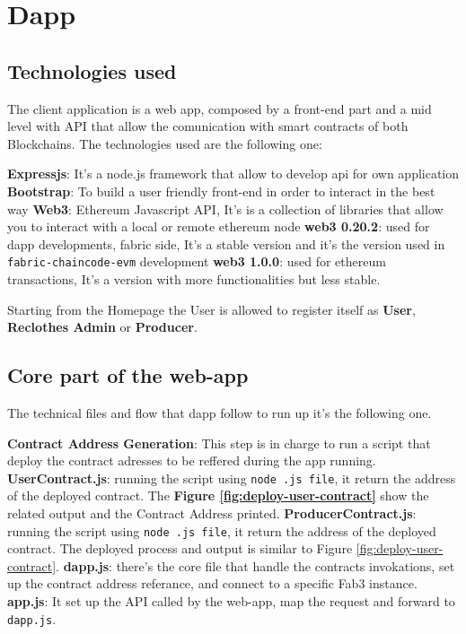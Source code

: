 \section{Dapp}

\subsection{Technologies used}

The client application is a web app, composed by a front-end part and a mid level with API that allow
the comunication with smart contracts of both Blockchains. The technologies used are the following one:

\begin{outline}
    \1 \textbf{Expressjs}: It's a node.js framework that allow to develop api for own application
    \1 \textbf{Bootstrap}: To build a user friendly front-end in order to interact in the best way
    \1 \textbf{Web3}: Ethereum Javascript API, It's is a collection of libraries that allow you to interact with a local or remote ethereum node 
    \2 \textbf{web3 0.20.2}: used for dapp developments, fabric side, It's a stable version and it's the version
    used in \texttt{fabric-chaincode-evm} development
    \2 \textbf{web3 1.0.0}: used for ethereum transactions, It's a version with more functionalities but less stable.
\end{outline}

Starting from the Homepage the User is allowed to register itself as \textbf{User}, \textbf{Reclothes Admin}
or \textbf{Producer}.

\subsection{Core part of the web-app}

The technical files and flow that dapp follow to run up it's the following one.

\begin{outline}[enumerate]
    \1 \textbf{Contract Address Generation}:
    \2 This step is in charge to run a script that deploy the contract adresses to be reffered during the 
    app running.
    \3 \textbf{UserContract.js}: running the script using \texttt{node .js file}, it return the address of the deployed contract.
    The \textbf{Figure \ref{fig:deploy-user-contract}} show the related output and the Contract Address
    printed. 
    \3 \textbf{ProducerContract.js}: running the script using \texttt{node .js file}, it return the address of the deployed contract.
    The deployed process and output is similar to Figure \ref{fig:deploy-user-contract}.
    \1  \textbf{dapp.js}: there's the core file that handle the contracts invokations, set up the contract address
    referance, and connect to a specific Fab3 instance.
    \1 \textbf{app.js}: It set up the API called by the web-app, map the request and forward to \texttt{dapp.js}.
\end{outline}

